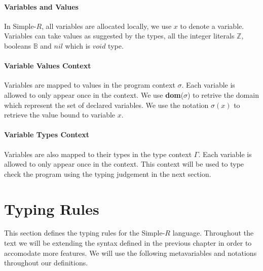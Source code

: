 \documentclass[a4paper,12pt]{report}
\begin{document}
\paragraph{Variables and Values} In Simple-$R$, all variables are allocated 
locally, we use $x$ to denote a variable. Variables can take values as suggested by the types, all the integer 
literals $\mathbb{Z}$, booleans $\mathbb{B}$ and $nil$ which is $void$ type. 

\paragraph{Variable Values Context} Variables are mapped to values in the program 
context $\sigma$. Each variable is allowed to only appear once in 
the context. We use \textbf{dom}($\sigma$) to retrive the domain which represent 
the set of declared variables. We use the notation $\sigma(x)$ 
to retrieve the value bound to variable $x$.

\paragraph{Variable Types Context} Variables are also mapped to their types 
in the type context $\Gamma$. Each variable is allowed to only appear once in 
the context. This context will be used to type check the program using the 
typing judgement in the next section.

\section{Typing Rules}
This section defines the typing rules for the Simple-$R$ language. 
Throughout the text we will be extending the syntax defined in the 
previous chapter in order to accomodate more features. 
We will use the following metavariables and notations throughout our 
definitions.
\end{document}
